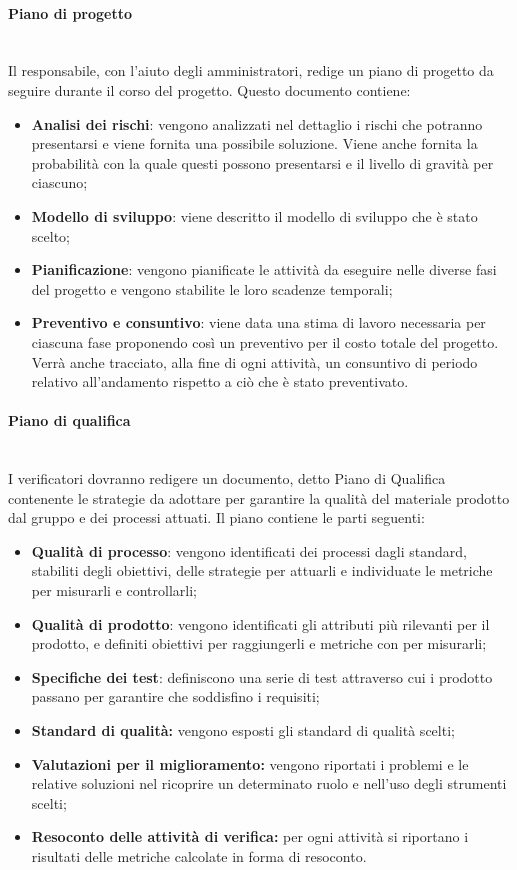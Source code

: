 		\paragraph{Piano di progetto} \mbox{}\\
		Il responsabile, con l'aiuto degli amministratori, redige un piano di progetto da seguire durante il corso del progetto. Questo documento contiene:
		\begin{itemize}
			\item \textbf{Analisi dei rischi}: vengono analizzati nel dettaglio i rischi che potranno presentarsi e viene fornita una possibile soluzione. Viene anche fornita la probabilità con la quale questi possono presentarsi e il livello di gravità per ciascuno;
			\item \textbf{Modello di sviluppo}: viene descritto il modello di sviluppo che è stato scelto;
			\item \textbf{Pianificazione}: vengono pianificate le attività da eseguire nelle diverse fasi del progetto e vengono stabilite le loro scadenze temporali;
			\item \textbf{Preventivo e consuntivo}: viene data una stima di lavoro necessaria per ciascuna fase proponendo così un preventivo per il costo totale del progetto. Verrà anche tracciato, alla fine di ogni attività, un consuntivo di periodo relativo all'andamento rispetto a ciò che è stato preventivato.
		\end{itemize}
		\paragraph{Piano di qualifica} \mbox{}\\
		I verificatori dovranno redigere un documento, detto Piano di Qualifica contenente le strategie da adottare per garantire la qualità del materiale prodotto dal gruppo e dei processi attuati. Il piano contiene le parti seguenti:
		\begin{itemize}
			\item \textbf{Qualità di processo}: vengono identificati dei processi dagli standard, stabiliti degli obiettivi, delle strategie per attuarli e individuate le metriche per misurarli e controllarli;
			\item \textbf{Qualità di prodotto}: vengono identificati gli attributi più rilevanti per il prodotto, e definiti obiettivi per raggiungerli e metriche con per misurarli;
			\item \textbf{Specifiche dei test}: definiscono una serie di test attraverso cui i prodotto passano per garantire che soddisfino i requisiti;
			\item \textbf{Standard di qualità:} vengono esposti gli standard di qualità scelti;
			\item \textbf{Valutazioni per il miglioramento:} vengono riportati i problemi e le relative soluzioni nel ricoprire un determinato ruolo e nell'uso degli strumenti scelti;
			\item \textbf{Resoconto delle attività di verifica:} per ogni attività si riportano i risultati delle metriche calcolate in forma di resoconto.
		\end{itemize}

